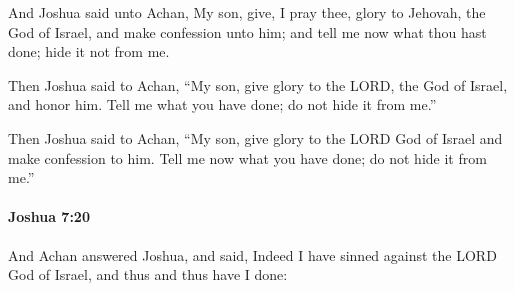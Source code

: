 			\begin{versebox}
					\item[BHS] 
					\item[ASV] And Joshua said unto Achan, My son, give, I pray thee, glory to Jehovah, the God of Israel, and make confession unto him; and tell me now what thou hast done; hide it not from me.
					\item[NIV] Then Joshua said to Achan, “My son, give glory to the LORD, the God of Israel, and honor him. Tell me what you have done; do not hide it from me.”
					\item[NRSV] Then Joshua said to Achan, “My son, give glory to the LORD God of Israel and make confession to him. Tell me now what you have done; do not hide it from me.”
			\end{versebox}

		\paragraph{Joshua 7:20} %
			\label{JOSHUA-7-20}

			And Achan answered Joshua, and said, Indeed I have sinned against the LORD God of Israel, and thus and thus have I done:

